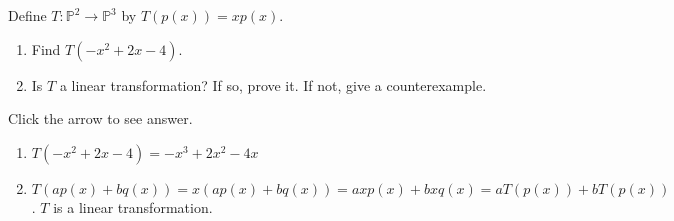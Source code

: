 \documentclass{ximera}
\begin{document}
\begin{problem}\label{prob:lintransmultbyx1}
Define $T:\mathbb{P}^2\rightarrow\mathbb{P}^3$ by $T(p(x))=xp(x)$.  
\begin{enumerate}
    \item Find $T(-x^2+2x-4)$.
    \item Is $T$ a linear transformation?  If so, prove it.  If not, give a counterexample.
\end{enumerate}

Click the arrow to see answer.

\begin{expandable}
    \begin{enumerate}
        \item $T(-x^2+2x-4)=-x^3+2x^2-4x$
        \item $T(ap(x)+bq(x))=x(ap(x)+bq(x))=axp(x)+bxq(x)=aT(p(x))+bT(p(x))$.  $T$ is a linear transformation.
    \end{enumerate}
    
\end{expandable}

\end{problem}
\end{document}
